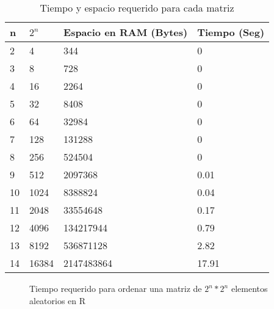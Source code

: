 \documentclass{article}
\begin{document}
\begin{table}[h]
\centering
\begin{tabular}{|l|l|l|l|}
\hline
n  & $2^n$ & Espacio en RAM (Bytes) & Tiempo (Seg) \\ \hline
2  & 4                    & 344                    & 0            \\ \hline
3  & 8                    & 728                    & 0            \\ \hline
4  & 16                   & 2264                   & 0            \\ \hline
5  & 32                   & 8408                   & 0            \\ \hline
6  & 64                   & 32984                  & 0            \\ \hline
7  & 128                  & 131288                 & 0            \\ \hline
8  & 256                  & 524504                 & 0            \\ \hline
9  & 512                  & 2097368                & 0.01         \\ \hline
10 & 1024                 & 8388824                & 0.04         \\ \hline
11 & 2048                 & 33554648               & 0.17         \\ \hline
12 & 4096                 & 134217944              & 0.79         \\ \hline
13 & 8192                 & 536871128              & 2.82         \\ \hline
14 & 16384                & 2147483864             & 17.91        \\ \hline
\end{tabular}
\caption{Tiempo y espacio requerido para cada matriz}
\label{tabla 1}
\end{table}
\begin{figure}
    \centering 
   
    \caption{Tiempo requerido para ordenar una matriz de $2^n * 2^n$ elementos  aleatorios en R}
    \label{grafica1}

\end{figure}
\end{document}

